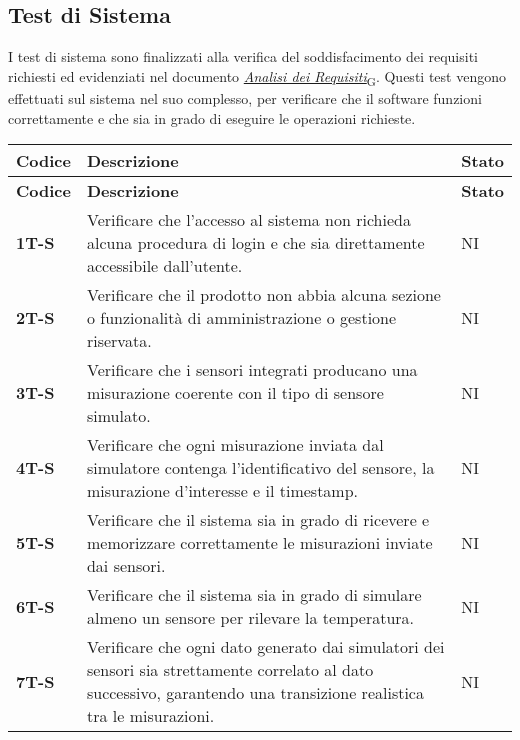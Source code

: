 \subsection{Test di Sistema}
I test di sistema sono finalizzati alla verifica del soddisfacimento dei requisiti richiesti ed evidenziati nel documento \href{https://7last.github.io/docs/rtb/documentazione-esterna/analisi-dei-requisiti}{\href{https://7last.github.io/docs/rtb/documentazione-interna/glossario\#analisi-dei-requisiti}{\textit{Analisi dei Requisiti}\textsubscript{G}}}. Questi test vengono effettuati sul sistema nel suo complesso, per verificare che il software funzioni correttamente e che sia in grado di eseguire le operazioni richieste. \\
\begin{longtable}{|>{\raggedright\arraybackslash}m{}|>{\raggedright\arraybackslash}m{}|>{\raggedright\arraybackslash}m{}|}
	\hline
	\textbf{Codice} & \textbf{Descrizione} & \textbf{Stato} \\
	\hline
	\endfirsthead
	\hline
	\textbf{Codice} & \textbf{Descrizione} & \textbf{Stato} \\
	\endhead
	\textbf{1T-S}   & Verificare che l'accesso al sistema non richieda alcuna procedura di login e che sia direttamente accessibile dall'utente.     & NI             \\
	\hline
	\textbf{2T-S}   & Verificare che il prodotto non abbia alcuna sezione o funzionalità di amministrazione o gestione riservata.     & NI\\
	\hline
	\textbf{3T-S}   & Verificare che i sensori integrati producano una misurazione coerente con il tipo di sensore simulato.     & NI\\
	\hline
	\textbf{4T-S}   & Verificare che ogni misurazione inviata dal simulatore contenga l’identificativo del sensore, la misurazione d'interesse e il timestamp. & NI\\
	\hline
	\textbf{5T-S}   & Verificare che il sistema sia in grado di ricevere e memorizzare correttamente le misurazioni inviate dai sensori. & NI\\
	\hline
	\textbf{6T-S}   & Verificare che il sistema sia in grado di simulare almeno un sensore per rilevare la temperatura. & NI\\
	\hline
	\textbf{7T-S}   & Verificare che ogni dato generato dai simulatori dei sensori sia strettamente correlato al dato successivo, garantendo una transizione realistica tra le misurazioni. & NI\\
	\hline

\end{longtable}
